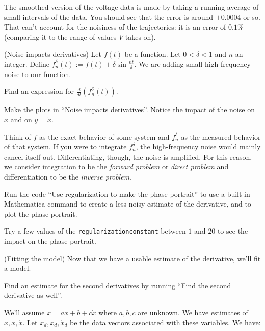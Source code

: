 \documentclass[12pt,letterpaper,noanswers]{exam}
\begin{document}
\begin{questions}
The smoothed version of the voltage data is made by taking a running average of small intervals of the data.  You should see that the error is around $\pm 0.0004$ or so.  That can't account for the noisiness of the trajectories: it is an error of $0.1$\% (comparing it to the range of values $V$ takes on).

\question (Noise impacts derivatives) Let $f(t)$ be a function.  Let $0<\delta < 1$ and $n$ an integer.  Define $f_n^{\delta}(t) := f(t) + \delta \sin \frac{n t}{\delta}$.  We are adding small high-frequency noise to our function.  
\begin{parts}
\item Find an expression for $\frac{d}{dt}\left(f_n^{\delta}(t)\right)$.
\item Make the plots in ``Noise impacts derivatives''.  Notice the impact of the noise on $x$ and on $y=\dot x$.
\end{parts}
Think of $f$ as the exact behavior of some system and $f_n^{\delta}$ as the measured behavior of that system.  If you were to integrate $f_n^{\delta}$, the high-frequency noise would mainly cancel itself out.  Differentiating, though, the noise is amplified.  For this reason, we consider integration to be the \emph{forward problem} or \emph{direct problem} and differentiation to be the \emph{inverse problem}.

\item Run the code ``Use regularization to make the phase portrait'' to use a built-in Mathematica command to create a less noisy estimate of the derivative, and to plot the phase portrait.  

Try a few values of the \texttt{regularizationconstant} between $1$ and $20$ to see the impact on the phase portrait.

\item (Fitting the model) Now that we have a usable estimate of the derivative, we'll fit a model.
\begin{parts}
\item Find an estimate for the second derivatives by running ``Find the second derivative as well''.
\item We'll assume $\ddot x = a x + b + c\dot x$ where $a,b,c$ are unknown.  We have estimates of $\ddot x, x, \dot x$.  Let $\ddot x_d, x_d, \dot x_d$ be the data vectors associated with these variables.  We have: 


\end{parts}
\end{questions}
\end{document}
